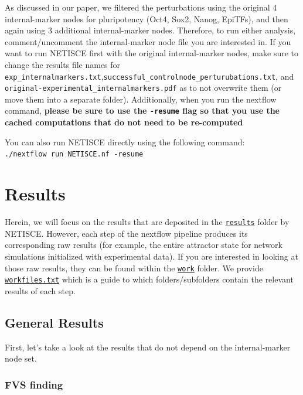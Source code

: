 \documentclass[
]{book}
\begin{document}
As discussed in our paper, we filtered the perturbations using the original 4 internal-marker nodes for pluripotency (Oct4, Sox2, Nanog, EpiTFs), and then again using 3 additional internal-marker nodes. Therefore, to run either analysis, comment/uncomment the internal-marker node file you are interested in. If you want to run NETISCE first with the original internal-marker nodes, make sure to change the results file names for \texttt{exp\_internalmarkers.txt},\texttt{successful\_controlnode\_perturubations.txt}, and \texttt{original-experimental\_internalmarkers.pdf} as to not overwrite them (or move them into a separate folder). Additionally, when you run the nextflow command, \textbf{please be sure to use the \texttt{-resume} flag so that you use the cached computations that do not need to be re-computed}

You can also run NETISCE directly using the following command: \texttt{./nextflow\ run\ NETISCE.nf\ -resume}

\hypertarget{results-1}{%
\section{Results}\label{results-1}}

Herein, we will focus on the results that are deposited in the \href{https://github.com/VeraLiconaResearchGroup/Netisce/tree/main/ipsc_validation/results}{\texttt{results}} folder by NETISCE. However, each step of the nextflow pipeline produces its corresponding raw results (for example, the entire attractor state for network simulations initialized with experimental data). If you are interested in looking at those raw results, they can be found within the \href{https://github.com/VeraLiconaResearchGroup/Netisce/tree/main/ipsc_validation/work}{\texttt{work}} folder. We provide \href{https://github.com/VeraLiconaResearchGroup/Netisce/blob/main/ipsc_validation/workfiles.txt}{\texttt{workfiles.txt}} which is a guide to which folders/subfolders contain the relevant results of each step.

\hypertarget{general-results}{%
\subsection{General Results}\label{general-results}}

First, let's take a look at the results that do not depend on the internal-marker node set.

\hypertarget{section-id}{%
\subsubsection*{FVS finding}\label{section-id}}
\end{document}
